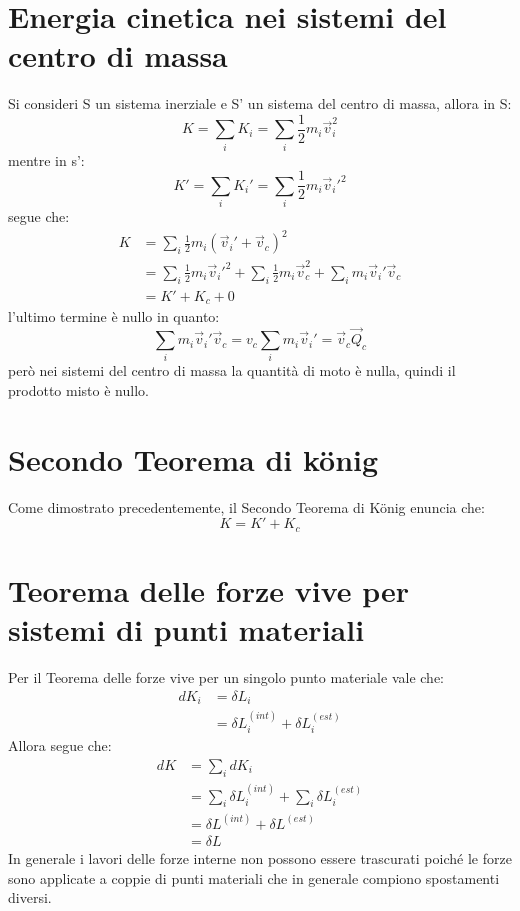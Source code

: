 \documentclass[11pt, a4paper, openright]{book}
\theoremstyle{plain}
\theoremstyle{definition}
\begin{document}
\section{Energia cinetica nei sistemi del centro di massa}
Si consideri S un sistema inerziale e S' un sistema del centro di massa, allora in S:
\begin{equation}
    K = \sum_i K_i = \sum_i \frac{1}{2}m_i\vec{v}_i^2
\end{equation}
mentre in s':
\begin{equation}
    K' = \sum_i K_i' = \sum_i \frac{1}{2}m_i\vec{v}_i'^2
\end{equation}
segue che:
\begin{align}
    K & = \sum_i \frac{1}{2}m_i(\vec{v}_i' + \vec{v}_c)^2 \\
      & = \sum_i \frac{1}{2}m_i \vec{v}_i'^2 + \sum_i \frac{1}{2}m_i \vec{v}_c^2 + \sum_i m_i \vec{v}_i'\vec{v}_c \\
      & = K' + K_c + 0 
\end{align}
l'ultimo termine è nullo in quanto:
\begin{equation}
    \sum_i m_i \vec{v}_i'\vec{v}_c = v_c \sum_i m_i \vec{v}_i' = \vec{v}_c \vec{Q}_c
\end{equation}
però nei sistemi del centro di massa la quantità di moto è nulla, quindi il prodotto misto è nullo.

\section{Secondo Teorema di k\"onig}
Come dimostrato precedentemente, il Secondo Teorema di K\"onig enuncia che:
\begin{equation}
    K = K' + K_c
\end{equation}

\section{Teorema delle forze vive per sistemi di punti materiali}
Per il Teorema delle forze vive per un singolo punto materiale vale che:
\begin{align}
    dK_i & = \delta L_i \\
    & = \delta L_i^{(int)} + \delta L_i^{(est)} 
\end{align}
Allora segue che:
\begin{align}
    dK  & = \sum_i dK_i \\
        & = \sum_i \delta L_i^{(int)} + \sum_i \delta L_i^{(est)} \\
        & = \delta L^{(int)} + \delta L^{(est)} \\
        & = \delta L
\end{align}
In generale i lavori delle forze interne non possono essere trascurati poiché le forze sono applicate a coppie di punti materiali che in generale compiono spostamenti diversi.
\end{document}

